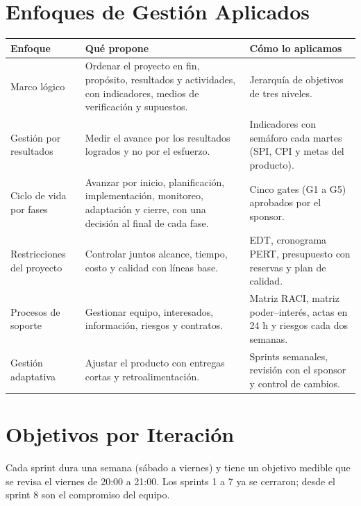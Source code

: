 \documentclass[11pt,a4paper]{article}
\begin{document}
\section{Enfoques de Gestión Aplicados}
{\footnotesize
{}
\noindent\begin{tabularx}{\textwidth}{@{}P{3.0cm} L L@{}}
\toprule
{}
\textbf{Enfoque} & \textbf{Qué propone} & \textbf{Cómo lo aplicamos} \\
\midrule
Marco lógico & Ordenar el proyecto en fin, propósito, resultados y actividades, con indicadores, medios de verificación y supuestos. & Jerarquía de objetivos de tres niveles. \\
Gestión por resultados & Medir el avance por los resultados logrados y no por el esfuerzo. & Indicadores con semáforo cada martes (SPI, CPI y metas del producto). \\
Ciclo de vida por fases & Avanzar por inicio, planificación, implementación, monitoreo, adaptación y cierre, con una decisión al final de cada fase. & Cinco gates (G1 a G5) aprobados por el sponsor. \\
Restricciones del proyecto & Controlar juntos alcance, tiempo, costo y calidad con líneas base. & EDT, cronograma PERT, presupuesto con reservas y plan de calidad. \\
Procesos de soporte & Gestionar equipo, interesados, información, riesgos y contratos. & Matriz RACI, matriz poder--interés, actas en 24 h y riesgos cada dos semanas. \\
Gestión adaptativa & Ajustar el producto con entregas cortas y retroalimentación. & Sprints semanales, revisión con el sponsor y control de cambios. \\
\bottomrule
\end{tabularx}
}

\section{Objetivos por Iteración}
Cada sprint dura una semana (sábado a viernes) y tiene un objetivo medible que se revisa el viernes de 20:00 a 21:00. Los sprints 1 a 7 ya se cerraron; desde el sprint 8 son el compromiso del equipo.
\end{document}
